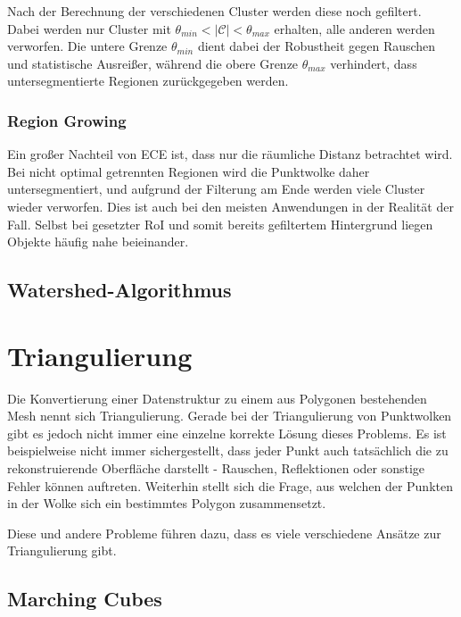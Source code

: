Nach der Berechnung der verschiedenen Cluster werden diese noch gefiltert.
Dabei werden nur Cluster mit $\theta_{min} < |\mathcal{C}| < \theta_{max}$ erhalten, alle anderen werden verworfen.
Die untere Grenze $\theta_{min}$ dient dabei der Robustheit gegen Rauschen und statistische Ausreißer, während die obere Grenze $\theta_{max}$ verhindert, dass untersegmentierte Regionen zurückgegeben werden.

\subsubsection{Region Growing}
\label{subsubsec:region-growing}

Ein großer Nachteil von \ac{ECE} ist, dass nur die räumliche Distanz betrachtet wird.
Bei nicht optimal getrennten Regionen wird die Punktwolke daher untersegmentiert, und aufgrund der Filterung am Ende werden viele Cluster wieder verworfen.
Dies ist auch bei den meisten Anwendungen in der Realität der Fall.
Selbst bei gesetzter \ac{RoI} und somit bereits gefiltertem Hintergrund liegen Objekte häufig nahe beieinander.


\subsection{Watershed-Algorithmus}
\label{subsec:watershed}


\section{Triangulierung}
\label{sec:triangulation}

Die Konvertierung einer Datenstruktur zu einem aus Polygonen bestehenden Mesh nennt sich Triangulierung.
Gerade bei der Triangulierung von Punktwolken gibt es jedoch nicht immer eine einzelne korrekte Lösung dieses Problems.
Es ist beispielweise nicht immer sichergestellt, dass jeder Punkt auch tatsächlich die zu rekonstruierende Oberfläche darstellt - Rauschen, Reflektionen oder sonstige Fehler können auftreten.
Weiterhin stellt sich die Frage, aus welchen der Punkten in der Wolke sich ein bestimmtes Polygon zusammensetzt.

Diese und andere Probleme führen dazu, dass es viele verschiedene Ansätze zur Triangulierung gibt.


\subsection{Marching Cubes}
\label{subsec:marching-cubes}

